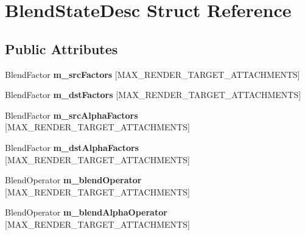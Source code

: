 \hypertarget{structBlendStateDesc}{}\section{Blend\+State\+Desc Struct Reference}
\label{structBlendStateDesc}
\subsection*{Public Attributes}
\begin{DoxyCompactItemize}
\item 
\mbox{\label{structBlendStateDesc_a0c86cbd4fce078055db85f2843aaec8f}} 
Blend\+Factor {\bfseries m\+\_\+src\+Factors} \mbox{[}M\+A\+X\+\_\+\+R\+E\+N\+D\+E\+R\+\_\+\+T\+A\+R\+G\+E\+T\+\_\+\+A\+T\+T\+A\+C\+H\+M\+E\+N\+TS\mbox{]}
\item 
\mbox{\label{structBlendStateDesc_a748ebaebfe2a4b35bc8180d956c7bcd5}} 
Blend\+Factor {\bfseries m\+\_\+dst\+Factors} \mbox{[}M\+A\+X\+\_\+\+R\+E\+N\+D\+E\+R\+\_\+\+T\+A\+R\+G\+E\+T\+\_\+\+A\+T\+T\+A\+C\+H\+M\+E\+N\+TS\mbox{]}
\item 
\mbox{\label{structBlendStateDesc_acea0722e740bd902e964ec188a2c729e}} 
Blend\+Factor {\bfseries m\+\_\+src\+Alpha\+Factors} \mbox{[}M\+A\+X\+\_\+\+R\+E\+N\+D\+E\+R\+\_\+\+T\+A\+R\+G\+E\+T\+\_\+\+A\+T\+T\+A\+C\+H\+M\+E\+N\+TS\mbox{]}
\item 
\mbox{\label{structBlendStateDesc_a84ade16b8acda9aa3b1675f32218ed99}} 
Blend\+Factor {\bfseries m\+\_\+dst\+Alpha\+Factors} \mbox{[}M\+A\+X\+\_\+\+R\+E\+N\+D\+E\+R\+\_\+\+T\+A\+R\+G\+E\+T\+\_\+\+A\+T\+T\+A\+C\+H\+M\+E\+N\+TS\mbox{]}
\item 
\mbox{\label{structBlendStateDesc_af3337b50096ac5ac2fd201a7bdfb4db6}} 
Blend\+Operator {\bfseries m\+\_\+blend\+Operator} \mbox{[}M\+A\+X\+\_\+\+R\+E\+N\+D\+E\+R\+\_\+\+T\+A\+R\+G\+E\+T\+\_\+\+A\+T\+T\+A\+C\+H\+M\+E\+N\+TS\mbox{]}
\item 
\mbox{\label{structBlendStateDesc_a3f2fdfe6c8b2ade220adabc27735f007}} 
Blend\+Operator {\bfseries m\+\_\+blend\+Alpha\+Operator} \mbox{[}M\+A\+X\+\_\+\+R\+E\+N\+D\+E\+R\+\_\+\+T\+A\+R\+G\+E\+T\+\_\+\+A\+T\+T\+A\+C\+H\+M\+E\+N\+TS\mbox{]}

\end{DoxyCompactItemize}
